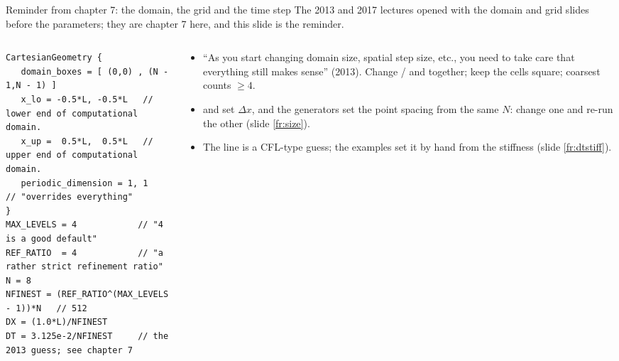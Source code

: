 \documentclass[aspectratio=169,11pt]{beamer}
\begin{document}
\begin{frame}[fragile]{Reminder from chapter 7: the domain, the grid and the time step}
\label{fr:reminder}
\small The 2013 and 2017 lectures opened with the domain and grid slides before the parameters; they are chapter 7 here, and this slide is the reminder.
\begin{columns}[T,onlytextwidth]
\begin{column}{0.5\textwidth}
\begin{lstlisting}[style=inputtiny]
CartesianGeometry {
   domain_boxes = [ (0,0) , (N - 1,N - 1) ]
   x_lo = -0.5*L, -0.5*L   // lower end of computational domain.
   x_up =  0.5*L,  0.5*L   // upper end of computational domain.
   periodic_dimension = 1, 1   // "overrides everything"
}
MAX_LEVELS = 4            // "4 is a good default"
REF_RATIO  = 4            // "a rather strict refinement ratio"
N = 8
NFINEST = (REF_RATIO^(MAX_LEVELS - 1))*N   // 512
DX = (1.0*L)/NFINEST
DT = 3.125e-2/NFINEST     // the 2013 guess; see chapter 7
\end{lstlisting}
\end{column}
\begin{column}{0.48\textwidth}
\footnotesize
\begin{itemize}
  \item ``As you start changing domain size, spatial step size, etc., you need to take care that everything still makes sense'' (2013). Change / and  together; keep the cells square; coarsest counts $\ge 4$.
  \item {} and  set $\Delta x$, and the generators set the point spacing from the same $N$: change one and re-run the other (slide \ref{fr:size}).
  \item The  line is a CFL-type guess; the examples set it by hand from the stiffness (slide \ref{fr:dtstiff}).
\end{itemize}
\end{column}
\end{columns}
\end{frame}
\end{document}
